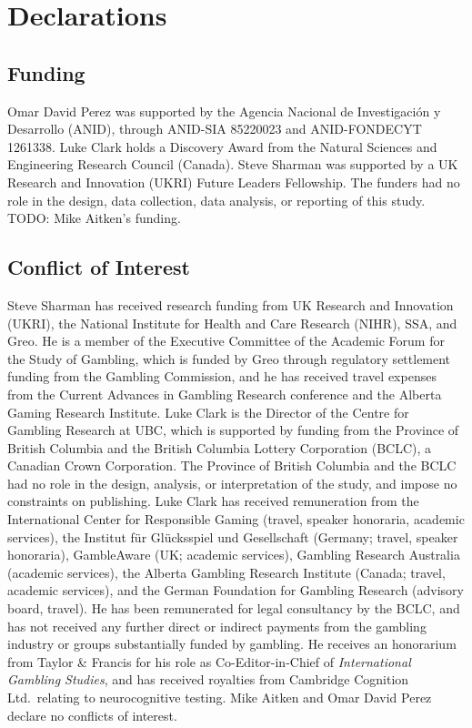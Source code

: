 \documentclass[man,floatsintext,donotrepeattitle]{apa7}
\begin{document}
\section*{Declarations}

\subsection*{Funding}

Omar David Perez was supported by the Agencia Nacional de Investigaci\'on y Desarrollo (ANID),
  through ANID-SIA 85220023 and ANID-FONDECYT 1261338. Luke Clark holds a Discovery Award from
  the Natural Sciences and Engineering Research Council (Canada). Steve Sharman was supported by a
  UK Research and Innovation (UKRI) Future Leaders Fellowship. The funders had no role in the
  design, data collection, data analysis, or reporting of this study. TODO: Mike Aitken's funding.

\subsection*{Conflict of Interest}

  Steve Sharman has received research funding from UK Research and Innovation (UKRI), the
  National Institute for Health and Care Research (NIHR), SSA, and Greo. He is a member of the
  Executive Committee of the Academic Forum for the Study of Gambling, which is funded by Greo
  through regulatory settlement funding from the Gambling Commission, and he has received travel
  expenses from the Current Advances in Gambling Research conference and the Alberta Gaming
  Research Institute. Luke Clark is the Director of the Centre for Gambling Research at UBC, which
  is supported by funding from the Province of British Columbia and the British Columbia Lottery
  Corporation (BCLC), a Canadian Crown Corporation. The Province of British Columbia and the BCLC
  had no role in the design, analysis, or interpretation of the study, and impose no constraints on
  publishing. Luke Clark has received remuneration from the International Center for Responsible
  Gaming (travel, speaker honoraria, academic services), the Institut f\"ur Gl\"ucksspiel und
  Gesellschaft (Germany; travel, speaker honoraria), GambleAware (UK; academic services), Gambling
  Research Australia (academic services), the Alberta Gambling Research Institute (Canada; travel,
  academic services), and the German Foundation for Gambling Research (advisory board, travel). He
  has been remunerated for legal consultancy by the BCLC, and has not received any further direct
  or indirect payments from the gambling industry or groups substantially funded by gambling. He
  receives an honorarium from Taylor \& Francis for his role as Co-Editor-in-Chief of
  \textit{International Gambling Studies}, and has received royalties from Cambridge Cognition
  Ltd.\ relating to neurocognitive testing. Mike Aitken and Omar David Perez declare no conflicts of
  interest.
\end{document}
